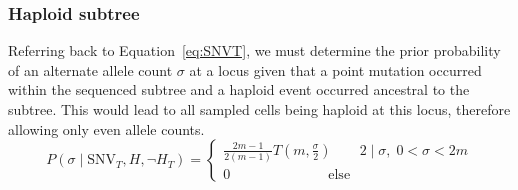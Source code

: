 \documentclass[../../main.tex]{subfiles}
\begin{document}
\subsubsection*{Haploid subtree}
Referring back to Equation~\eqref{eq:SNVT}, we must determine the prior probability of an alternate allele count $\sigma$ at a locus given that a point mutation occurred within the sequenced subtree and a haploid event occurred ancestral to the subtree.
This would lead to all sampled cells being haploid at this locus, therefore allowing only even allele counts.
\begin{equation*}
P(\sigma\mid \text{SNV}_T,H,\neg H_T) = \begin{cases} \frac{2m-1}{2(m-1)}T(m,\frac{\sigma}{2})\qquad 2\mid\sigma,\;0<\sigma<2m\\ 0 \qquad\qquad\qquad\quad \text{else} \end{cases}
\end{equation*}
\end{document}
